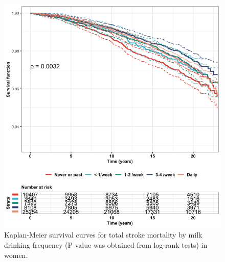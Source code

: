 \documentclass[]{tufte-handout}
\begin{document}
\begin{figure}

{\centering \includegraphics[width=0.9\linewidth]{fig/KMfigwomen} 

}

\caption[Kaplan-Meier survival curves for total stroke mortality by milk drinking frequency (P value was obtained from log-rank tests) in women]{Kaplan-Meier survival curves for total stroke mortality by milk drinking frequency (P value was obtained from log-rank tests) in women.}\label{fig:KMwomen}
\end{figure}

\newpage
\end{document}
